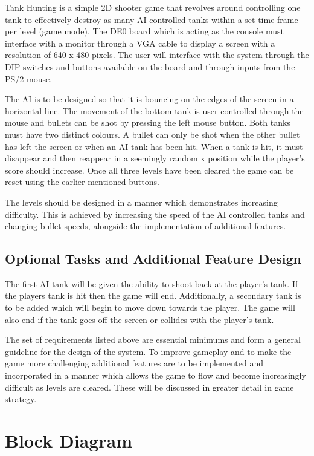 \documentclass[a4paper,10pt,twoside]{article}
\begin{document}
Tank Hunting is a simple 2D shooter game that revolves around controlling one tank to effectively destroy as many AI controlled tanks within a set time frame per level (game mode). The DE0 board which is acting as the console must interface with a monitor through a VGA cable to display a screen with a resolution of 640 x 480 pixels. The user will interface with the system through the DIP switches and buttons available on the board and through inputs from the PS/2 mouse.

The AI is to be designed so that it is bouncing on the edges of the screen in a horizontal line. The movement of the bottom tank is user controlled through the mouse and bullets can be shot by pressing the left mouse button. Both tanks must have two distinct colours. A bullet can only be shot when the other bullet has left the screen or when an AI tank has been hit. When a tank is hit, it must disappear and then reappear in a seemingly random x position while the player’s score should increase. Once all three levels have been cleared the game can be reset using the earlier mentioned buttons.

The levels should be designed in a manner which demonstrates increasing difficulty. This is achieved by increasing the speed of the AI controlled tanks and changing bullet speeds, alongside the implementation of additional features. 

\subsection{Optional Tasks and Additional Feature Design}

The first AI tank will be given the ability to shoot back at the player’s tank. If the players tank is hit then the game will end. Additionally, a secondary tank is to be added which will begin to move down towards the player. The game will also end if the tank goes off the screen or collides with the player’s tank. 

The set of requirements listed above are essential minimums and form a general guideline for the design of the system. To improve gameplay and to make the game more challenging additional features are to be implemented and incorporated in a manner which allows the game to flow and become increasingly difficult as levels are cleared. These will be discussed in greater detail in game strategy.

\section{Block Diagram}
\end{document}
